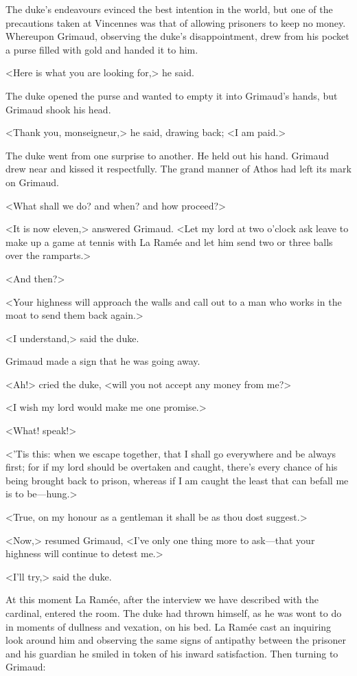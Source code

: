 The duke's endeavours evinced the best intention in the world, but one of the precautions taken at Vincennes was that of allowing prisoners to keep no money. Whereupon Grimaud, observing the duke's disappointment, drew from his pocket a purse filled with gold and handed it to him.

<Here is what you are looking for,> he said.

The duke opened the purse and wanted to empty it into Grimaud's hands, but Grimaud shook his head.

<Thank you, monseigneur,> he said, drawing back; <I am paid.>

The duke went from one surprise to another. He held out his hand. Grimaud drew near and kissed it respectfully. The grand manner of Athos had left its mark on Grimaud.

<What shall we do? and when? and how proceed?>

<It is now eleven,> answered Grimaud. <Let my lord at two o'clock ask leave to make up a game at tennis with La Ramée and let him send two or three balls over the ramparts.>

<And then?>

<Your highness will approach the walls and call out to a man who works in the moat to send them back again.>

<I understand,> said the duke.

Grimaud made a sign that he was going away.

<Ah!> cried the duke, <will you not accept any money from me?>

<I wish my lord would make me one promise.>

<What! speak!>

<'Tis this: when we escape together, that I shall go everywhere and be always first; for if my lord should be overtaken and caught, there's every chance of his being brought back to prison, whereas if I am caught the least that can befall me is to be—hung.>

<True, on my honour as a gentleman it shall be as thou dost suggest.>

<Now,> resumed Grimaud, <I've only one thing more to ask—that your highness will continue to detest me.>

<I'll try,> said the duke.

At this moment La Ramée, after the interview we have described with the cardinal, entered the room. The duke had thrown himself, as he was wont to do in moments of dullness and vexation, on his bed. La Ramée cast an inquiring look around him and observing the same signs of antipathy between the prisoner and his guardian he smiled in token of his inward satisfaction. Then turning to Grimaud:

